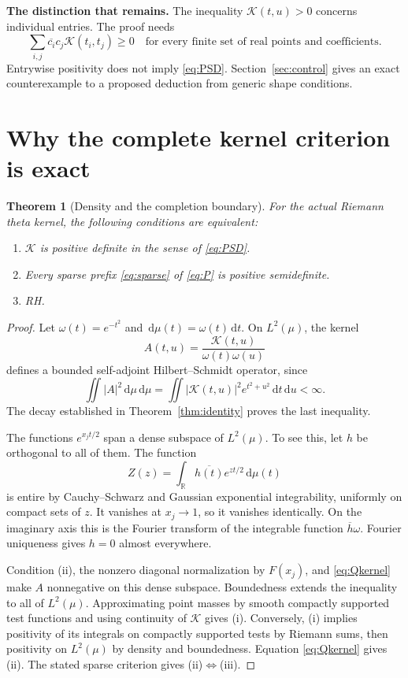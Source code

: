 \documentclass[11pt,letterpaper]{article}
\newtheorem{theorem}{Theorem}[section]
\theoremstyle{remark}\newtheorem{remark}[theorem]{Remark}
\newcommand{\R}{\mathbb R}\newcommand{\C}{\mathbb C}
\newcommand{\K}{\mathcal K}\newcommand{\dd}{\,\mathrm d}
\numberwithin{equation}{section}
\begin{document}
\textbf{The distinction that remains.} The inequality $\K(t,u)>0$ concerns individual entries. The proof needs
\begin{equation}\label{eq:PSD}
\sum_{i,j}\overline{c_i}c_j\K(t_i,t_j)\ge0
\quad\text{for every finite set of real points and coefficients.}
\end{equation}
Entrywise positivity does not imply \eqref{eq:PSD}. Section~\ref{sec:control} gives an exact counterexample to a proposed deduction from generic shape conditions.

\section{Why the complete kernel criterion is exact}

\begin{theorem}[Density and the completion boundary]\label{thm:density}
For the actual Riemann theta kernel, the following conditions are equivalent:
\begin{enumerate}[label=(\roman*)]
\item $\K$ is positive definite in the sense of \eqref{eq:PSD}.
\item Every sparse prefix \eqref{eq:sparse} of \eqref{eq:P} is positive semidefinite.
\item RH.
\end{enumerate}
\end{theorem}
\begin{proof}
Let $\omega(t)=e^{-t^2}$ and $\dd\mu(t)=\omega(t)\dd t$. On $L^2(\mu)$, the kernel
\[
A(t,u)=\frac{\K(t,u)}{\omega(t)\omega(u)}
\]
defines a bounded self-adjoint Hilbert--Schmidt operator, since
\[
\iint|A|^2\dd\mu\dd\mu
=\iint|\K(t,u)|^2e^{t^2+u^2}\dd t\dd u<\infty.
\]
The decay established in Theorem~\ref{thm:identity} proves the last inequality.

The functions $e^{x_jt/2}$ span a dense subspace of $L^2(\mu)$. To see this, let $h$ be orthogonal to all of them. The function
\[
Z(z)=\int_{\R}\overline{h(t)}e^{zt/2}\dd\mu(t)
\]
is entire by Cauchy--Schwarz and Gaussian exponential integrability, uniformly on compact sets of $z$. It vanishes at $x_j\to1$, so it vanishes identically. On the imaginary axis this is the Fourier transform of the integrable function $\overline h\omega$. Fourier uniqueness gives $h=0$ almost everywhere.

Condition (ii), the nonzero diagonal normalization by $F(x_j)$, and \eqref{eq:Qkernel} make $A$ nonnegative on this dense subspace. Boundedness extends the inequality to all of $L^2(\mu)$. Approximating point masses by smooth compactly supported test functions and using continuity of $\K$ gives (i). Conversely, (i) implies positivity of its integrals on compactly supported tests by Riemann sums, then positivity on $L^2(\mu)$ by density and boundedness. Equation \eqref{eq:Qkernel} gives (ii). The stated sparse criterion gives (ii)$\Leftrightarrow$(iii).
\end{proof}
\end{document}
